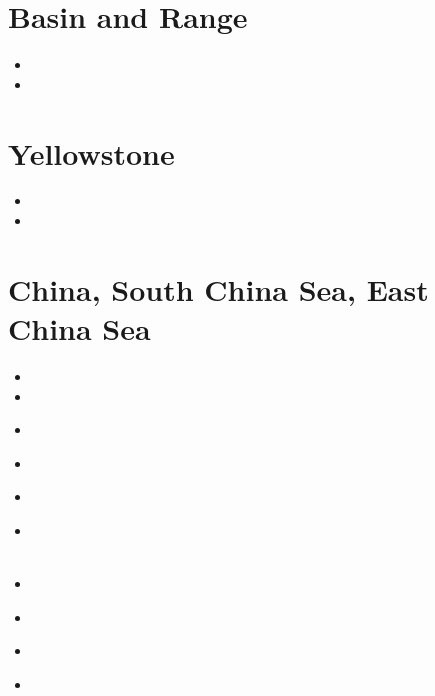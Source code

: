 \section{Basin and Range}

\begin{small}
\begin{itemize}
\item[\nineteeneightynine]
\item[\twothousandnine]
\end{itemize}
\end{small}

\section{Yellowstone}

\begin{small}
\begin{itemize}
\item[\twothousandthirteen]
\item[\twothousandeighteen]
\end{itemize}
\end{small}

\section{China, South China Sea, East China Sea}

\begin{small}
\begin{itemize}
\item[\twothousandten] 
\item[\twothousandfifteen] 
\item[\twothousandsixteen] 
 \\ 
\item[\twothousandeighteen] 
 \\
\item[\twothousandnineteen] 
\item[\twothousandtwenty] 
 \\
 \\
\item[\twothousandtwentyone] 
 \\
\item[\twothousandtwentytwo] 
\item[\twothousandtwentythree] 
 \\
\item[\twothousandtwentyfour] 
\end{itemize}
\end{small}

